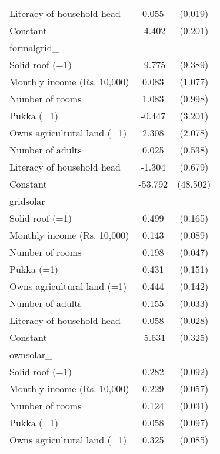 \begin{table}[htbp]
{\begin{tabular}{l*{1}{cc}}
Literacy of household head&       0.055\sym{***}&     (0.019)\\
Constant            &      -4.402\sym{***}&     (0.201)\\
\midrule
formalgrid\_         &                     &            \\
Solid roof (=1)     &      -9.775         &     (9.389)\\
Monthly income (Rs. 10,000)&       0.083         &     (1.077)\\
Number of rooms     &       1.083         &     (0.998)\\
Pukka (=1)          &      -0.447         &     (3.201)\\
Owns agricultural land (=1)&       2.308         &     (2.078)\\
Number of adults    &       0.025         &     (0.538)\\
Literacy of household head&      -1.304\sym{*}  &     (0.679)\\
Constant            &     -53.792         &    (48.502)\\
\midrule
gridsolar\_          &                     &            \\
Solid roof (=1)     &       0.499\sym{***}&     (0.165)\\
Monthly income (Rs. 10,000)&       0.143         &     (0.089)\\
Number of rooms     &       0.198\sym{***}&     (0.047)\\
Pukka (=1)          &       0.431\sym{***}&     (0.151)\\
Owns agricultural land (=1)&       0.444\sym{***}&     (0.142)\\
Number of adults    &       0.155\sym{***}&     (0.033)\\
Literacy of household head&       0.058\sym{**} &     (0.028)\\
Constant            &      -5.631\sym{***}&     (0.325)\\
\midrule
ownsolar\_           &                     &            \\
Solid roof (=1)     &       0.282\sym{***}&     (0.092)\\
Monthly income (Rs. 10,000)&       0.229\sym{***}&     (0.057)\\
Number of rooms     &       0.124\sym{***}&     (0.031)\\
Pukka (=1)          &       0.058         &     (0.097)\\
Owns agricultural land (=1)&       0.325\sym{***}&     (0.085)\\

\end{tabular}}
\end{table}
